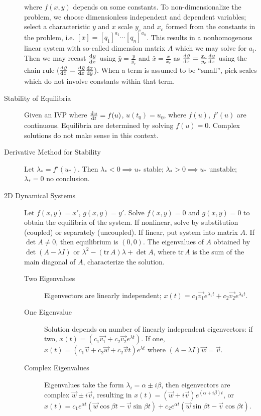 \documentclass[8pt]{article}
\begin{document}
\begin{multicols}{2}
\begin{description}
    where $f(x,y)$ depends on some constants. To non-dimensionalize the problem,
    we choose dimensionless independent and dependent variables; select a
    characteristic $y$ and $x$ scale $y_c$ and $x_c$ formed from the constants
    in the problem, i.e. $[x]={[q_1]}^{a_1}\cdots {[q_n]}^{a_n}$. This results
    in a nonhomogenous linear system with so-called dimension matrix $A$ which
    we may solve for $a_i$. Then we may recast $\frac{\mathrm{d}^{} {y}}{\mathrm{d}{x}^{}}$ using
    $\bar{y}=\frac{y}{y_c}$ and $\bar{x}=\frac{x}{x_c}$ as
    $\frac{\mathrm{d}^{} {\bar{y}}}{\mathrm{d}{\bar{x}}^{}}=\frac{x_c}{y_c}\frac{\mathrm{d}^{} {y}}{\mathrm{d}{x}^{}}$ using the chain rule
    ($\frac{\mathrm{d}^{} {\bar{y}}}{\mathrm{d}{\bar{x}}^{}}=\frac{\mathrm{d}^{} {\bar{y}}}{\mathrm{d}{x}^{}}\frac{\mathrm{d}{x}}{\mathrm{d}{\bar{y}}}$). When a
    term is assumed to be ``small'', pick scales which do not involve constants
    within that term.

  \item[Stability of Equilibria] Given an IVP where $\frac{\mathrm{d}^{} {u}}{\mathrm{d}{t}^{}}=f(u)$,
    $u(t_0)=u_0$, where $f(u)$, $f'(u)$ are continuous. Equilibria are
    determined by solving $f(u)=0$. Complex solutions do not make sense in this
    context.
  \item[Derivative Method for Stability] Let $\lambda_*=f'(u_*)$. Then
    $\lambda_*<0\implies u_*$ stable; $\lambda_*>0\implies u_*$ unstable;
    $\lambda_*=0$ no conclusion.
  \item[2D Dynamical Systems] Let $f(x,y) = x'$, $g(x,y) = y'$. Solve $f(x,y)=0$
    and $g(x,y)=0$ to obtain the equilibria of the system. If nonlinear, solve
    by substitution (coupled) or separately (uncoupled). If linear, put system
    into matrix $A$. If $\det A \ne 0$, then equilibrium is $(0,0)$. The
    eigenvalues of $A$ obtained by $\det(A-\lambda I)$ or
    $\lambda^2-(\text{tr}\,A)\lambda+\det A$, where $\text{tr}\,A$ is the sum of
    the main diagonal of $A$, characterize the solution.
    \begin{description}
    \item[Two Eigenvalues] Eigenvectors are linearly independent;
      $x(t)=c_1\vec{v_1}e^{\lambda_1 t}+c_2\vec{v_2}e^{\lambda_2 t}$.
    \item[One Eigenvalue] Solution depends on number of linearly independent
      eigenvectors: if two, $x(t)=(c_1\vec{v_1}+c_2\vec{v_2}e^{\lambda t})$. If
      one, $x(t)=(c_1\vec{v}+c_2\vec{w}+c_2\vec{v}t)e^{\lambda t}$ where
      $(A-\lambda I)\vec{w}=\vec{v}$.
    \item[Complex Eigenvalues] Eigenvalues take the form $\lambda_i = \alpha \pm
      i\beta$, then eigenvectors are complex $\vec{w}\pm i\vec{v}$, resulting in
      $x(t)=(\vec{w}+i\vec{v})e^{(\alpha+i\beta)t}$, or $x(t)=c_1e^{\alpha
        t}(\vec{w}\cos\beta t-\vec{v}\sin\beta t) + c_2e^{\alpha
        t}(\vec{w}\sin\beta t-\vec{v}\cos\beta t)$.
    \end{description}
   \end{description}
 \end{multicols}
\end{document}
